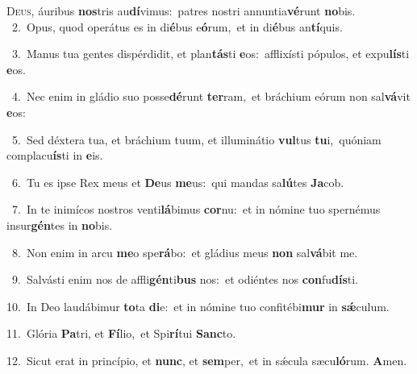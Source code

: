 \lettrine{\initial\textcolor{\initialcolor}{D}}{eus,} áuribus \textbf{nos}\-tris au\-\textbf{dí}\-vimus:~\star patres nostri annuntia\-\textbf{vé}\-runt \textbf{no}\-bis.\\
{\numbfont\textcolor{\numbcolor}{~2.}}~Opus, quod operátus es in di\-\textbf{é}\-bus e\-\textbf{ó}\-rum,~\star et in di\-\textbf{é}\-bus an\-\textbf{tí}\-quis.\par
{\numbfont\textcolor{\numbcolor}{~3.}}~Manus tua gentes dispérdidit, et plan\-\textbf{tás}\-ti \textbf{e}\-os:~\star afflixísti pópulos, et expu\-\textbf{lís}\-ti \textbf{e}\-os.\par
{\numbfont\textcolor{\numbcolor}{~4.}}~Nec enim in gládio suo posse\-\textbf{dé}\-runt \textbf{ter}\-ram,~\star et bráchium eórum non sal\-\textbf{vá}\-vit \textbf{e}\-os:\par
{\numbfont\textcolor{\numbcolor}{~5.}}~Sed déxtera tua, et bráchium tuum, et illuminátio \textbf{vul}\-tus \textbf{tu}\-i,~\star quóniam complacu\-\textbf{ís}\-ti in \textbf{e}\-is.\par
{\numbfont\textcolor{\numbcolor}{~6.}}~Tu es ipse Rex meus et \textbf{De}\-us \textbf{me}\-us:~\star qui mandas sa\-\textbf{lú}\-tes \textbf{Ja}\-cob.\par
{\numbfont\textcolor{\numbcolor}{~7.}}~In te inimícos nostros venti\-\textbf{lá}\-bimus \textbf{cor}\-nu:~\star et in nómine tuo spernémus insur\-\textbf{gén}\-tes in \textbf{no}\-bis.\par
{\numbfont\textcolor{\numbcolor}{~8.}}~Non enim in arcu \textbf{me}\-o spe\-\textbf{rá}\-bo:~\star et gládius meus \textbf{non} sal\-\textbf{vá}\-bit me.\par
{\numbfont\textcolor{\numbcolor}{~9.}}~Salvásti enim nos de affli\-\textbf{gén}\-ti\textbf{bus} nos:~\star et odiéntes nos \textbf{con}\-fu\-\textbf{dís}\-ti.\par
{\numbfont\textcolor{\numbcolor}{10.}}~In Deo laudábimur \textbf{to}\-ta \textbf{di}\-e:~\star et in nómine tuo confitébi\textbf{mur} in \textbf{sǽ}\-culum.\par
{\numbfont\textcolor{\numbcolor}{11.}}~Glória \textbf{Pa}\-tri, et \textbf{Fí}\-lio,~\star et Spi\-\textbf{rí}\-tui \textbf{Sanc}\-to.\par
{\numbfont\textcolor{\numbcolor}{12.}}~Sicut erat in princípio, et \textbf{nunc}\-, et \textbf{sem}\-per,~\star et in sǽcula sæcu\-\textbf{ló}\-rum. \textbf{A}\-men.\par
